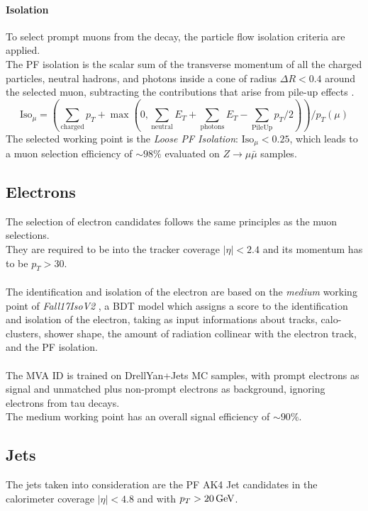 \paragraph*{Isolation}
To select prompt muons from the \PW decay, the particle flow isolation criteria are applied.\\
The PF isolation is the scalar sum of the transverse momentum of all the charged particles, neutral hadrons, and  photons inside a cone of radius $\Delta R<0.4$ around the selected muon, subtracting the contributions that arise from pile-up effects \cite{2018MuonData}.
\begin{equation}
    \text{Iso}_\mu = \left(\sum_{\text{charged}} p_T+\max\left(0,\sum_{\text{neutral}}E_T+\sum_{\text{photons}}E_T-\sum_{\text{PileUp}}p_T/2\right)\right)\bigg/p_T(\mu)
\end{equation}
The selected working point is the \emph{Loose PF Isolation}: $\text{Iso}_\mu<0.25$, which leads to a muon selection efficiency of $\sim 98\%$ evaluated on $Z \to \mu \bar{\mu}$ samples.






\subsection{Electrons}
The selection of electron candidates follows the same principles as the muon selections.\\
They are required to be into the tracker coverage $|\eta|<2.4$ and its momentum has to be $p_T>30$.\\
\\
The identification and isolation of the electron are based on the \emph{medium} working point of \textit{Fall17IsoV2} \cite{2018ElectronConference}, a BDT model which assigns a score to the identification and isolation of the electron, taking as input informations about tracks, calo-clusters, shower shape, the amount of radiation collinear with the electron track, and the PF isolation.\\
\\
The MVA ID is trained on DrellYan+Jets MC samples, with prompt electrons as signal and unmatched plus non-prompt electrons as background, ignoring electrons from tau decays.\\
The medium working point has an overall signal efficiency of $\sim 90\%$.

\subsection{Jets}\label{sec:jet}
The jets taken into consideration are the PF AK4 Jet candidates in the calorimeter coverage $|\eta|<4.8$ and with $p_T>20{\,\text{Ge\hspace{-.08em}V}}$.

